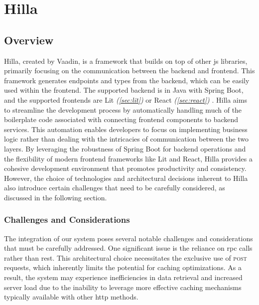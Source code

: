 \section{Hilla}
\label{sec:hilla}

\subsection{Overview}
\label{subsec:hilla:overview}

Hilla, created by Vaadin, is a \gls{framework} that builds on top of other \acrshort{js} libraries, primarily focusing on the communication between the backend and frontend. This \gls{framework} generates endpoints and types from the backend, which can be easily used within the frontend. The supported backend is in Java with Spring Boot, and the supported frontends are Lit \textit{(\ref{sec:lit})} \cite{hilla:lit} or React \textit{(\ref{sec:react})} \cite{hilla:react}. Hilla aims to streamline the development process by automatically handling much of the boilerplate code associated with connecting frontend components to backend services. This automation enables developers to focus on implementing business logic rather than dealing with the intricacies of communication between the two layers. By leveraging the robustness of Spring Boot for backend operations and the flexibility of modern frontend frameworks like Lit and React, Hilla provides a cohesive development environment that promotes productivity and consistency. However, the choice of technologies and architectural decisions inherent to Hilla also introduce certain challenges that need to be carefully considered, as discussed in the following section.

\subsubsection{Challenges and Considerations}
\label{subsec:hilla:challenges}

The integration of our system poses several notable challenges and considerations that must be carefully addressed. One significant issue is the reliance on \acrshort{rpc} calls rather than \acrshort{rest}. This architectural choice necessitates the exclusive use of \textsc{post} requests, which inherently limits the potential for caching optimizations. As a result, the system may experience inefficiencies in data retrieval and increased server load due to the inability to leverage more effective caching mechanisms typically available with other \acrshort{http} methods.

